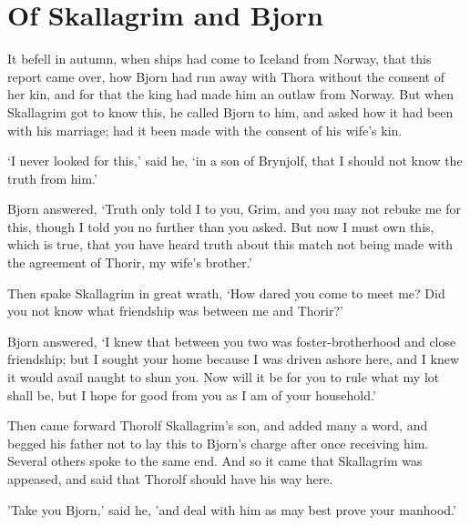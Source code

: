 \chapter{Of Skallagrim and Bjorn}
It befell in autumn, when ships had come to Iceland from Norway, that this report came over, how Bjorn had run away with Thora without the consent of her kin, and for that the king had made him an outlaw from Norway. But when Skallagrim got to know this, he called Bjorn to him, and asked how it had been with his marriage; had it been made with the consent of his wife's kin.

`I never looked for this,' said he, `in a son of Brynjolf, that I should not know the truth from him.'

Bjorn answered, `Truth only told I to you, Grim, and you may not rebuke me for this, though I told you no further than you asked. But now I must own this, which is true, that you have heard truth about this match not being made with the agreement of Thorir, my wife's brother.'

Then spake Skallagrim in great wrath, `How dared you come to meet me? Did you not know what friendship was between me and Thorir?'

Bjorn answered, `I knew that between you two was foster-brotherhood and close friendship; but I sought your home because I was driven ashore here, and I knew it would avail naught to shun you. Now will it be for you to rule what my lot shall be, but I hope for good from you as I am of your household.'

Then came forward Thorolf Skallagrim's son, and added many a word, and begged his father not to lay this to Bjorn's charge after once receiving him. Several others spoke to the same end. And so it came that Skallagrim was appeased, and said that Thorolf should have his way here.

'Take you Bjorn,' said he, 'and deal with him as may best prove your manhood.'

